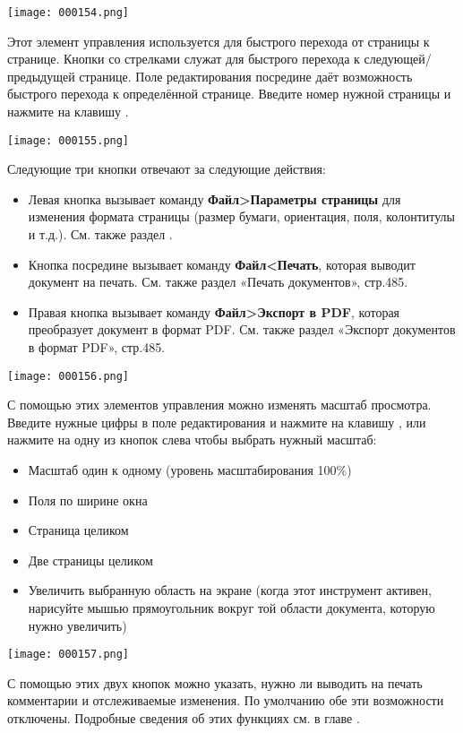 ﻿\documentclass[a4paper,10pt]{article}
\begin{document}
\texttt{[image: 000154.png]}

Этот элемент управления используется для быстрого перехода от страницы к странице. Кнопки со стрелками служат для быстрого перехода к следующей/предыдущей странице. Поле редактирования посредине даёт возможность быстрого перехода к определённой странице. Введите номер нужной страницы и нажмите на клавишу .

\texttt{[image: 000155.png]}

Следующие три кнопки отвечают за следующие действия:
\begin{itemize}
 \item Левая кнопка вызывает команду \textbf{Файл>Параметры страницы} для изменения формата страницы (размер бумаги, ориентация, поля, колонтитулы и т.д.). См. также раздел .
 \item Кнопка посредине вызывает команду \textbf{Файл<Печать}, которая выводит документ на печать. См. также раздел «Печать документов», стр.485.
 \item Правая кнопка вызывает команду \textbf{Файл>Экспорт в PDF}, которая преобразует документ в формат PDF. См. также раздел «Экспорт документов в формат PDF», стр.485. 
\end{itemize}

\texttt{[image: 000156.png]}

С помощью этих элементов управления можно изменять масштаб просмотра. Введите нужные цифры в поле редактирования и нажмите на клавишу , или нажмите на одну из кнопок слева чтобы выбрать нужный масштаб:

\begin{itemize}
 \item Масштаб один к одному (уровень масштабирования 100\%)
 \item Поля по ширине окна
 \item Страница целиком
 \item Две страницы целиком
 \item Увеличить выбранную область на экране (когда этот инструмент активен, нарисуйте мышью прямоугольник вокруг той области документа, которую нужно увеличить)
\end{itemize}

\texttt{[image: 000157.png]}

С помощью этих двух кнопок можно указать, нужно ли выводить на печать комментарии и отслеживаемые изменения. По умолчанию обе эти возможности отключены. Подробные сведения об этих функциях см. в главе .
\end{document}
